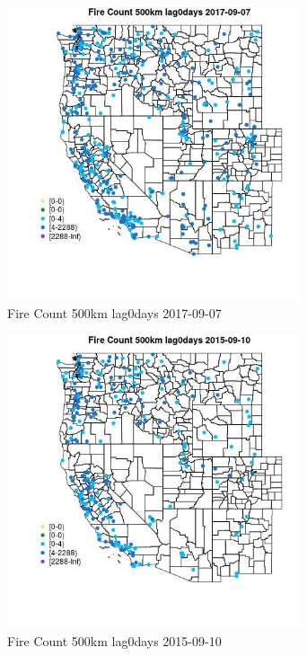 \begin{figure} 
\centering  
\includegraphics[width=0.77\textwidth]{Code_Outputs/Report_ML_input_PM25_Step4_part_e_de_duplicated_aves_compiled_2019-05-20wNAs_MapObsFire_Count_500km_lag0days2017-09-07.jpg} 
\caption{\label{fig:Report_ML_input_PM25_Step4_part_e_de_duplicated_aves_compiled_2019-05-20wNAsMapObsFire_Count_500km_lag0days2017-09-07}Fire Count 500km lag0days 2017-09-07} 
\end{figure} 
 

\begin{figure} 
\centering  
\includegraphics[width=0.77\textwidth]{Code_Outputs/Report_ML_input_PM25_Step4_part_e_de_duplicated_aves_compiled_2019-05-20wNAs_MapObsFire_Count_500km_lag0days2015-09-10.jpg} 
\caption{\label{fig:Report_ML_input_PM25_Step4_part_e_de_duplicated_aves_compiled_2019-05-20wNAsMapObsFire_Count_500km_lag0days2015-09-10}Fire Count 500km lag0days 2015-09-10} 
\end{figure} 
 

